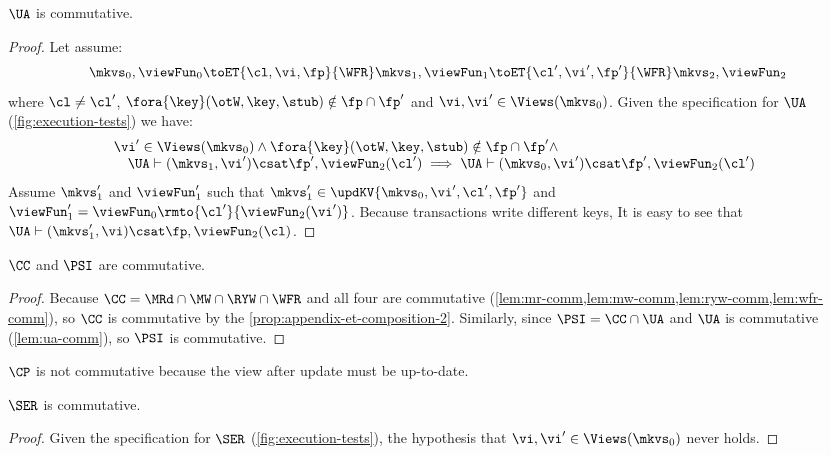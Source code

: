 \begin{lemma}
    \label{lem:ua-comm}
    \(\UA\) is commutative.
\end{lemma}
\begin{proof}
    Let assume:
    \[
        \mkvs_0, \viewFun_0 \toET{\cl, \vi, \fp}{\WFR} \mkvs_1, \viewFun_1 \toET{\cl', \vi', \fp'}{\WFR} \mkvs_2, \viewFun_2 
    \]
    where \( \cl \neq \cl' \), \( \fora{ \key } (\otW, \key, \stub) \notin \fp \cap \fp' \) and \( \vi, \vi' \in \Views(\mkvs_0)\).
    Given the specification for \( \UA \) (\cref{fig:execution-tests}) we have:
    \[
        \begin{array}{@{}l}
            \vi' \in \Views(\mkvs_0) \land \fora{ \key } (\otW, \key, \stub) \notin \fp \cap \fp' \land \\ 
            \quad \UA \vdash (\mkvs_1, \vi') \csat \fp', \viewFun_2(\cl') \implies  \UA \vdash (\mkvs_0, \vi') \csat \fp', \viewFun_2(\cl')
        \end{array}
    \]
    Assume \( \mkvs'_1 \) and \( \viewFun'_1 \) such that \( \mkvs'_1 \in \updKV{\mkvs_0,\vi',\cl',\fp'} \) and \( \viewFun'_1 = \viewFun_0\rmto{\cl'}{\viewFun_2(\vi')} \).
    Because transactions write different keys, It is easy to see that \( \UA \vdash (\mkvs'_1, \vi) \csat \fp, \viewFun_2(\cl) \).
\end{proof}

\begin{proposition}
    \( \CC \) and \( \PSI \) are commutative.
\end{proposition}
\begin{proof}
    Because \( \CC = \MRd \cap \MW \cap \RYW \cap \WFR \) and all four are commutative (\cref{lem:mr-comm,lem:mw-comm,lem:ryw-comm,lem:wfr-comm}), so \( \CC \) is commutative by the \cref{prop:appendix-et-composition-2}.
    Similarly, since \( \PSI = \CC \cap \UA \) and \( \UA \) is commutative (\cref{lem:ua-comm}), so \( \PSI \) is commutative.
\end{proof}

\( \CP \) is not commutative because the view after update must be up-to-date.

\begin{lemma}
    \label{lem:ser-comm}
    \( \SER \) is commutative.
\end{lemma}
\begin{proof}
    Given the specification for \( \SER \) (\cref{fig:execution-tests}), the hypothesis that \( \vi, \vi' \in \Views(\mkvs_0) \) never holds.
\end{proof}

